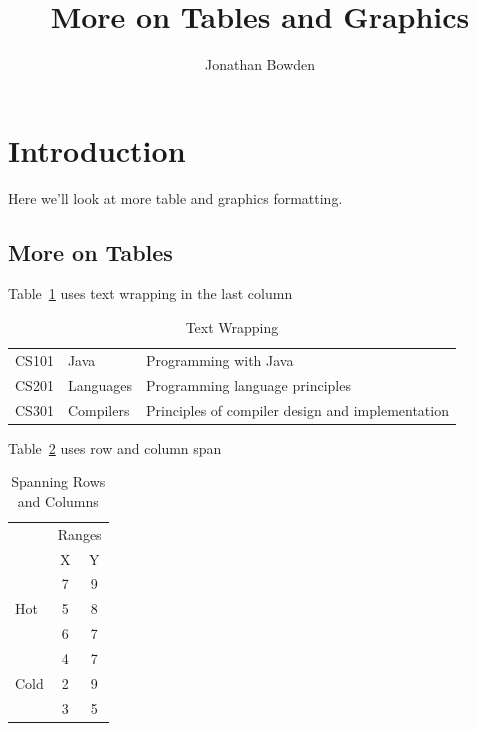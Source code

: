 \documentclass{proc}
\title{More on Tables and Graphics}
\author{Jonathan Bowden}
\begin{document}
\maketitle

\section{Introduction}

Here we'll look at more table and graphics formatting.

\subsection{More on Tables}

Table~\ref{tab:wrapping} uses text wrapping in the last column

\begin{table}[htbp]
	\caption{Text Wrapping}
	\begin{center}
	\begin{tabular}{| l | l | p{3cm} |}
		\hline
		CS101 & Java & Programming with Java \\
		CS201 & Languages & Programming language principles \\
		CS301 & Compilers & Principles of compiler design and implementation \\
		\hline
	\end{tabular}
	\end{center}
	\label{tab:wrapping}
\end{table}

Table~\ref{tab:multi} uses row and column span

\begin{table}[htbp]
	\caption{Spanning Rows and Columns}
	\begin{center}
	\begin{tabular}{| l | c | c |}
		\hline
		& \multicolumn{2}{c|}{Ranges} \\
		& X & Y \\
		\hline
		\multirow{3}{*}{Hot} & 7 & 9 \\ %
		& 5 & 8 \\
		& 6 & 7 \\
		\hline
		\multirow{3}{*}{Cold} & 4 & 7 \\ %
		& 2 & 9 \\
		& 3 & 5 \\
		\hline

	\end{tabular}
	\end{center}
	\label{tab:multi}
\end{table}
\end{document}
